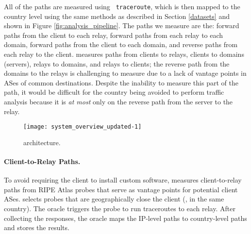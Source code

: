 All of the paths are measured using {\tt 
traceroute}, which is then mapped to the country level using the same methods as 
described in Section \ref{datasets} and shown in Figure 
\ref{fig:analysis_pipeline}.  The paths we measure are the: forward paths from 
the client to each relay, forward paths from each relay to each domain, forward 
paths from the client to each domain, and reverse paths from each relay to the 
client. 
\system{} measures paths from clients to relays, clients to domains (servers),
relays to domains, and relays to clients; the reverse path from the domains to the relays 
is challenging to measure due to a lack of vantage points in ASes of
common destinations.  
Despite the inability to measure this part of the
path, it would be difficult for the country being avoided to perform
traffic analysis because it is {\it at most} only on the reverse path 
from the server to the relay. 

\begin{figure}[t!]
    \centering
        \texttt{[image: system\_overview\_updated-1]}
        \caption{\system{} architecture.}
        \label{fig:arch}
\end{figure}


\paragraph{Client-to-Relay Paths.} 
To avoid requiring the client to install custom software, \system{}
measures client-to-relay paths from RIPE Atlas probes that serve as 
vantage points for potential client ASes.  \system{} selects probes that
are geographically close the client (\eg, in the same 
country). The oracle triggers the probe to run traceroutes
to each relay.  After collecting the responses, the oracle maps 
the IP-level paths to country-level paths and stores the results.

